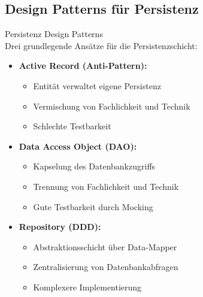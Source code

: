\subsection{Design Patterns für Persistenz}

\begin{theorem}{Persistenz Design Patterns}\\
Drei grundlegende Ansätze für die Persistenzschicht:
\begin{itemize}
    \item \textbf{Active Record (Anti-Pattern):}
    \begin{itemize}
        \item Entität verwaltet eigene Persistenz
        \item Vermischung von Fachlichkeit und Technik
        \item Schlechte Testbarkeit
    \end{itemize}
    \item \textbf{Data Access Object (DAO):}
    \begin{itemize}
        \item Kapselung des Datenbankzugriffs
        \item Trennung von Fachlichkeit und Technik
        \item Gute Testbarkeit durch Mocking
    \end{itemize}
    \item \textbf{Repository (DDD):}
    \begin{itemize}
        \item Abstraktionsschicht über Data-Mapper
        \item Zentralisierung von Datenbankabfragen
        \item Komplexere Implementierung
    \end{itemize}
\end{itemize}
\end{theorem}

